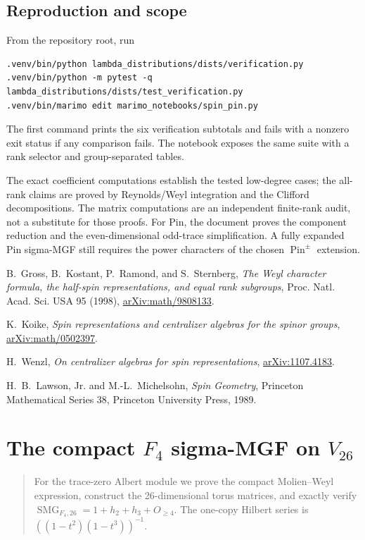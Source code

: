 \documentclass[10pt]{article}
\newcommand{\CT}{\operatorname{CT}}
\newcommand{\SMG}{\operatorname{SMG}}
\begin{document}
\subsection{Reproduction and scope}

From the repository root, run
\begin{verbatim}
.venv/bin/python lambda_distributions/dists/verification.py
.venv/bin/python -m pytest -q lambda_distributions/dists/test_verification.py
.venv/bin/marimo edit marimo_notebooks/spin_pin.py
\end{verbatim}
The first command prints the six verification subtotals and fails with a
nonzero exit status if any comparison fails.  The notebook exposes the same
suite with a rank selector and group-separated tables.

The exact coefficient computations establish the tested low-degree cases;
the all-rank claims are proved by Reynolds/Weyl integration and the Clifford
decompositions.  The matrix computations are an independent finite-rank
audit, not a substitute for those proofs.  For Pin, the document proves the
component reduction and the even-dimensional odd-trace simplification.  A
fully expanded Pin sigma-MGF still requires the power characters of the
chosen $\operatorname{Pin}^{\pm}$ extension.

\begin{thebibliography}{9}
B.~Gross, B.~Kostant, P.~Ramond, and S.~Sternberg,
\emph{The Weyl character formula, the half-spin representations, and equal
rank subgroups}, Proc. Natl. Acad. Sci. USA 95 (1998),
\href{https://arxiv.org/abs/math/9808133}{arXiv:math/9808133}.

K.~Koike,
\emph{Spin representations and centralizer algebras for the spinor groups},
\href{https://arxiv.org/abs/math/0502397}{arXiv:math/0502397}.

H.~Wenzl,
\emph{On centralizer algebras for spin representations},
\href{https://arxiv.org/abs/1107.4183}{arXiv:1107.4183}.

H.~B.~Lawson, Jr. and M.-L.~Michelsohn,
\emph{Spin Geometry}, Princeton Mathematical Series 38,
Princeton University Press, 1989.
\end{thebibliography}

\clearpage
\section[The compact F4 sigma-MGF on V26]{The compact $F_4$ sigma-MGF on $V_{26}$}\label{proof:f4}
\begingroup
{}
\providecommand{\Sg}{\SMG}
\renewcommand{\Sg}{\SMG}
\providecommand{\CT}{\operatorname{CT}}
\renewcommand{\CT}{\operatorname{CT}}
\setcounter{theorem}{0}
\setcounter{proposition}{0}
\setcounter{lemma}{0}
\setcounter{corollary}{0}
\setcounter{remark}{0}
\begin{abstract}
For the trace-zero Albert module we prove the compact Molien--Weyl expression,
construct the 26-dimensional torus matrices, and exactly verify
$\Sg_{F_4,26}=1+h_2+h_3+O_{\ge4}$.  The one-copy Hilbert series is
$((1-t^2)(1-t^3))^{-1}$.
\end{abstract}
\end{document}
